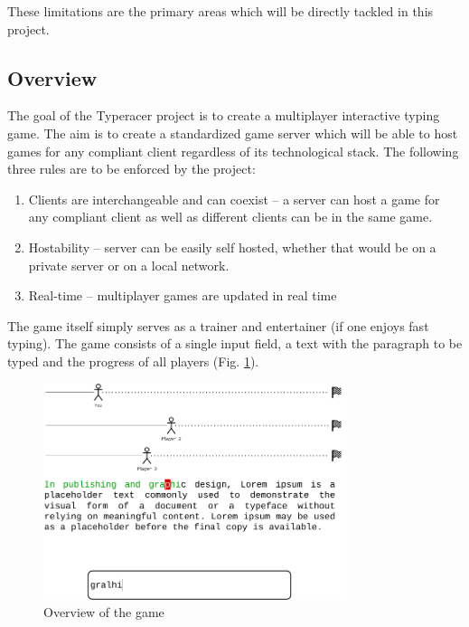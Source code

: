 \documentclass[titlepage]{article}
\newcommand{\figref}[1]{{(Fig. \hypersetup{linkcolor=blue}\ref{#1})}}
\begin{document}
These limitations are the primary areas which will be directly tackled in this project.

\subsection{Overview}

The goal of the Typeracer project is to create a multiplayer interactive typing game. The aim is to create a standardized game server which will be able to host games for any compliant client regardless of its technological stack. The following three rules are to be enforced by the project:

\begin{enumerate}
	\item Clients are interchangeable and can coexist -- a server can host a game for any compliant client as well as different clients can be in the same game.

	\item Hostability -- server can be easily self hosted, whether that would be on a private server or on a local network.

	\item Real-time -- multiplayer games are updated in real time
\end{enumerate}

The game itself simply serves as a trainer and entertainer (if one enjoys fast typing). The game consists of a single input field, a text with the paragraph to be typed and the progress of all players \figref{fig:overview}.

\begin{figure}[ht]
	\centering
	\includegraphics[width=0.79\textwidth]{overview.png}
	\caption{Overview of the game}
	\label{fig:overview}
\end{figure}
\end{document}
